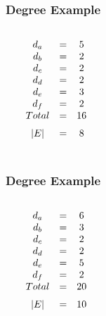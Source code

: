 \documentclass[dvipsnames]{beamer}
\begin{document}
\begin{frame}
  \frametitle{Degree Example}

  \begin{example}
    \begin{columns}
      \begin{center}
      \end{center}

      $\begin{array}{ccc}
      d_a & = & 5\\
      d_b & = & 2\\
      d_c & = & 2\\
      d_d & = & 2\\
      d_e & = & 3\\
      d_f & = & 2\\
      \medskip
      Total & = & 16\\
      \medskip
      |E| & = & 8
      \end{array}$
    \end{columns}
  \end{example}
\end{frame}

\begin{frame}
  \frametitle{Degree Example}

  \begin{example}[multigraph]
    \begin{columns}
      \begin{center}
      \end{center}

      $\begin{array}{ccc}
      d_a & = & 6\\
      d_b & = & 3\\
      d_c & = & 2\\
      d_d & = & 2\\
      d_e & = & 5\\
      d_f & = & 2\\
      \medskip
      Total & = & 20\\
      \medskip
      |E| & = & 10
      \end{array}$
    \end{columns}
  \end{example}
\end{frame}
\end{document}
